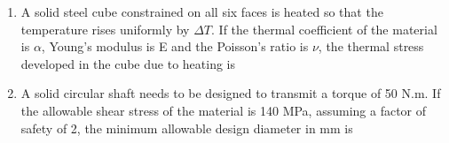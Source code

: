 \documentclass[journal,12pt,onecolumn]{IEEEtran}
\begin{document}
\begin{enumerate}[resume]
          \begin{enumerate}
          \end{enumerate}

    \item A solid steel cube constrained on all six faces is heated so that the temperature rises uniformly by \(\Delta T\). If the thermal coefficient of the material is \(\alpha\), Young's modulus is E and the Poisson's ratio is \(\nu\), the thermal stress developed in the cube due to heating is

          \begin{enumerate}
          \end{enumerate}

    \item A solid circular shaft needs to be designed to transmit a torque of 50 N.m. If the allowable shear stress of the material is 140 MPa, assuming a factor of safety of 2, the minimum allowable design diameter in mm is
          \begin{enumerate}
          \end{enumerate}


\end{enumerate}
\end{document}
